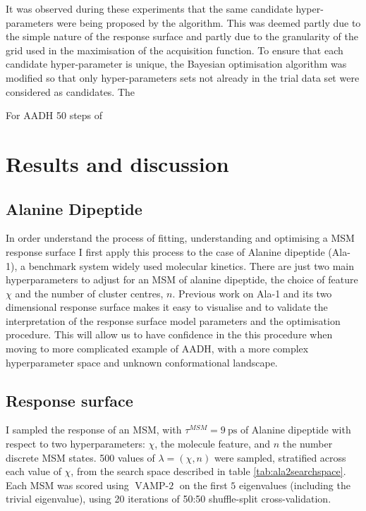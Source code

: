 It was observed during these experiments that the same candidate hyper-parameters were being proposed by the algorithm. This was deemed partly due to the simple nature of the response surface and partly due to the granularity of the grid used in the maximisation of the acquisition function. To ensure that each candidate hyper-parameter is unique, the Bayesian optimisation algorithm was modified so that only  hyper-parameters sets not already in the trial data set were considered as candidates. The 

For AADH 50 steps of 

\section{Results and discussion}
\subsection{Alanine Dipeptide}\label{subsec:ala1}


In order understand the process of fitting, understanding and optimising a MSM response surface I first apply this process to the case of Alanine dipeptide (Ala-1), a benchmark system widely used molecular kinetics. There are just two main hyperparameters to adjust for an MSM of alanine dipeptide, the choice of feature $\chi$ and the number of cluster centres, $n$. Previous work on Ala-1 and its two dimensional response surface makes it easy to visualise and to validate the interpretation of the response surface model parameters and the optimisation procedure. This will allow us to have confidence in the this procedure when moving to more complicated example of AADH, with a more complex hyperparameter space and unknown conformational landscape.

\subsection{Response surface}

I sampled the response of an MSM, with $\tau^{MSM}=\SI{9}{\pico\second}$ of Alanine dipeptide with respect to two hyperparameters: $\chi$, the molecule feature, and $n$ the number discrete MSM states. \num{500} values of $\lambda = (\chi, n)$ were sampled, stratified across each value of $\chi$, from the search space described in table \ref{tab:ala2searchspace}. Each MSM was scored using  $\operatorname{VAMP-2}$ on the first $5$ eigenvalues (including the trivial eigenvalue), using \num{20} iterations of 50:50 shuffle-split cross-validation. 


